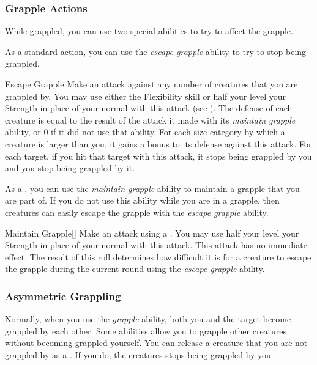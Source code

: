         \subsubsection{Grapple Actions}\label{Grapple Actions}
            While grappled, you can use two special abilities to try to affect the grapple.

            \label{Escape Grapple} As a standard action, you can use the \textit{escape grapple} ability to try to stop being grappled.

            \begin{activeability}{Escape Grapple}
                \rankline
                Make an attack against any number of creatures that you are grappled by.
                You may use either the Flexibility skill or half your level \add your Strength in place of your normal  with this attack (see ).
                The defense of each creature is equal to the result of the attack it made with its \textit{maintain grapple} ability, or 0 if it did not use that ability.
                For each size category by which a creature is larger than you, it gains a  bonus to its defense against this attack.
                For each target, if you hit that target with this attack, it stops being grappled by you and you stop being grappled by it.
            \end{activeability}

            \label{Maintain Grapple} As a , you can use the \textit{maintain grapple} ability to maintain a grapple that you are part of.
            If you do not use this ability while you are in a grapple, then creatures can easily escape the grapple with the \textit{escape grapple} ability.
            \begin{activeability}{Maintain Grapple}[]
                \rankline
                Make an attack using a .
                You may use half your level \add your Strength in place of your normal  with this attack.
                This attack has no immediate effect.
                The result of this roll determines how difficult it is for a creature to escape the grapple during the current round using the \textit{escape grapple} ability.
            \end{activeability}

        \subsubsection{Asymmetric Grappling}\label{Asymmetric Grappling}
            Normally, when you use the \textit{grapple} ability, both you and the target become grappled by each other.
            Some abilities allow you to grapple other creatures without becoming grappled yourself.
            You can release a creature that you are not grappled by as a .
            If you do, the creatures stops being grappled by you.

